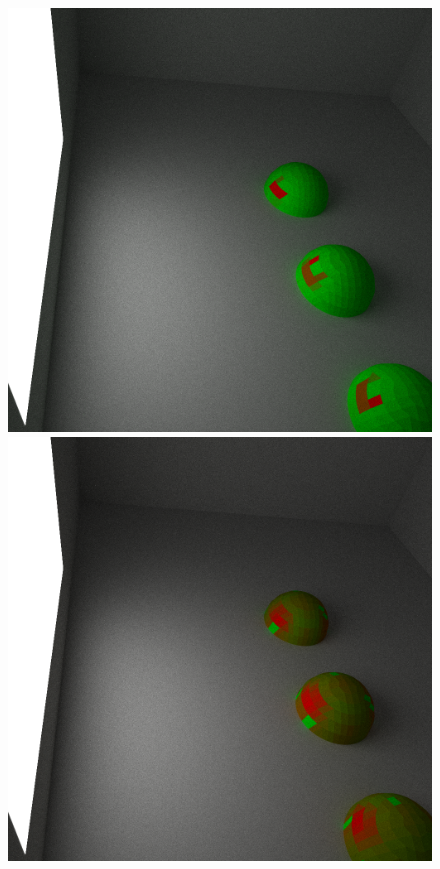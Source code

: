 \documentclass[../dissertation.tex]{subfiles}
\begin{document}
\begin{figure}[h]
\centering
{}
  \includegraphics[width=\textwidth]{images/renders/expected_sarsa_visualisation.png}   
  \label{fig:exp_saras_distribution}
\endminipage\hspace{2em}
  \includegraphics[width=\textwidth]{images/renders/neural_q_visualisation.png}

\end{figure}
\end{document}
